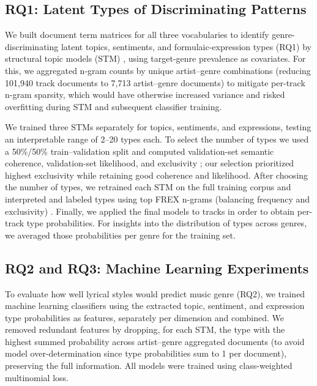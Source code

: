 \documentclass{article}
\begin{document}
\subsection{RQ1: Latent Types of Discriminating Patterns}
We built document term matrices for all three vocabularies to identify genre-discriminating latent topics, sentiments, and formulaic-expression types (RQ1) by structural topic models (STM) \cite{robertsStmPackageStructural2019}, using target-genre prevalence as covariates. For this, we aggregated n-gram counts by unique artist–genre combinations (reducing 101,940 track documents to 7,713 artist–genre documents) to mitigate per-track n-gram sparsity, which would have otherwise increased variance and risked overfitting during STM and subsequent classifier training.

We trained three STMs separately for topics, sentiments, and expressions, testing an interpretable range of 2–20 types each. To select the number of types we used a 50\%/50\% train–validation split and computed validation-set semantic coherence, validation-set likelihood, and exclusivity \cite{robertsStructuralTopicModels2014}; our selection prioritized highest exclusivity while retaining good coherence and likelihood. After choosing the number of types, we retrained each STM on the full training corpus and interpreted and labeled types using top FREX n-grams (balancing frequency and exclusivity) \cite{bischofSummarizingTopicalContent2012}. Finally, we applied the final models to tracks in order to obtain per-track type probabilities. For insights into the distribution of types across genres, we averaged those probabilities per genre for the training set.


\subsection{RQ2 and RQ3: Machine Learning Experiments}
To evaluate how well lyrical styles would predict music genre (RQ2), we trained machine learning classifiers using the extracted topic, sentiment, and expression type probabilities as features, separately per dimension and combined. We removed redundant features by dropping, for each STM, the type with the highest summed probability across artist–genre aggregated documents (to avoid model over-determination since type probabilities sum to 1 per document), preserving the full information. All models were trained using class-weighted multinomial loss.
\end{document}
